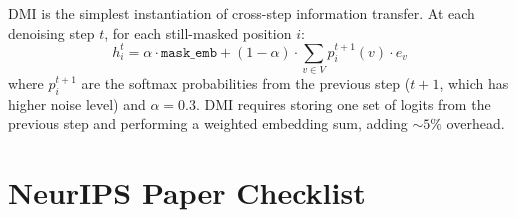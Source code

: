 \documentclass{article}
\begin{document}
DMI is the simplest instantiation of cross-step information transfer. At each denoising step $t$, for each still-masked position $i$:
\begin{equation}
h_i^t = \alpha \cdot \texttt{mask\_emb} + (1 - \alpha) \cdot \sum_{v \in V} p_i^{t+1}(v) \cdot e_v
\end{equation}
where $p_i^{t+1}$ are the softmax probabilities from the previous step ($t{+}1$, which has higher noise level) and $\alpha = 0.3$. DMI requires storing one set of logits from the previous step and performing a weighted embedding sum, adding ${\sim}5\%$ overhead.


\section*{NeurIPS Paper Checklist}
\end{document}
